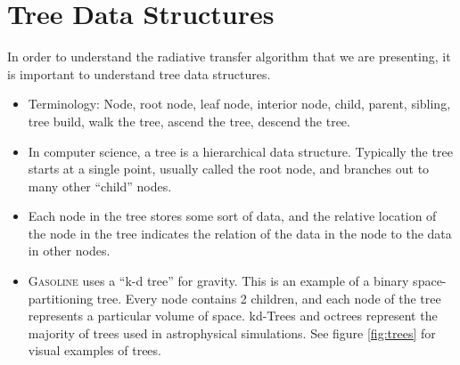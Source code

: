 
\section{Tree Data Structures}
\label{sec:treestruct}

In order to understand the radiative transfer algorithm that we are presenting, it is important to understand tree data structures.

\begin{itemize}
\item Terminology: Node, root node, leaf node, interior node, child, parent, sibling, tree build, walk the tree, ascend the tree, descend the tree.
\item In computer science, a tree is a hierarchical data structure. Typically the tree starts at a single point, usually called the root node, and branches out to many other ``child'' nodes.
\item Each node in the tree stores some sort of data, and the relative location of the node in the tree indicates the relation of the data in the node to the data in other nodes.
\item \textsc{Gasoline} uses a ``k-d tree'' for gravity. This is an example of a binary space-partitioning tree. Every node contains 2 children, and each node of the tree represents a particular volume of space. kd-Trees and octrees represent the majority of trees used in astrophysical simulations. See figure \ref{fig:trees} for visual examples of trees.
\end{itemize}

